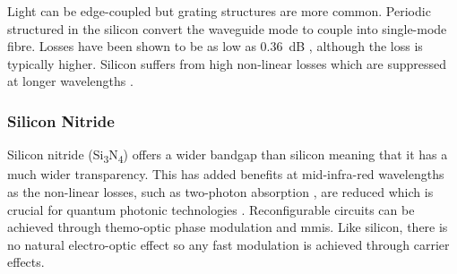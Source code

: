 Light can be edge-coupled but grating structures are more common. Periodic structured in the silicon convert the waveguide mode to couple into single-mode fibre. Losses have been shown to be as low as \SI{0.36}{dB} \cite{Notaros2016}, although the loss is typically higher. Silicon suffers from high non-linear losses which are suppressed at longer wavelengths \cite{rosenfeld2019mid}.






\subsubsection*{Silicon Nitride}

Silicon nitride (Si\textsubscript{3}N\textsubscript{4}) offers a wider bandgap than silicon meaning that it has a much wider transparency. This has added benefits at mid-infra-red wavelengths as the non-linear losses, such as two-photon absorption \cite{tan2018nonlinear}, are reduced which is crucial for quantum photonic technologies \cite{lu2019chip}. Reconfigurable circuits can be achieved through themo-optic phase modulation and \acp{mmi}. Like silicon, there is no natural electro-optic effect so any fast modulation is achieved through carrier effects.

